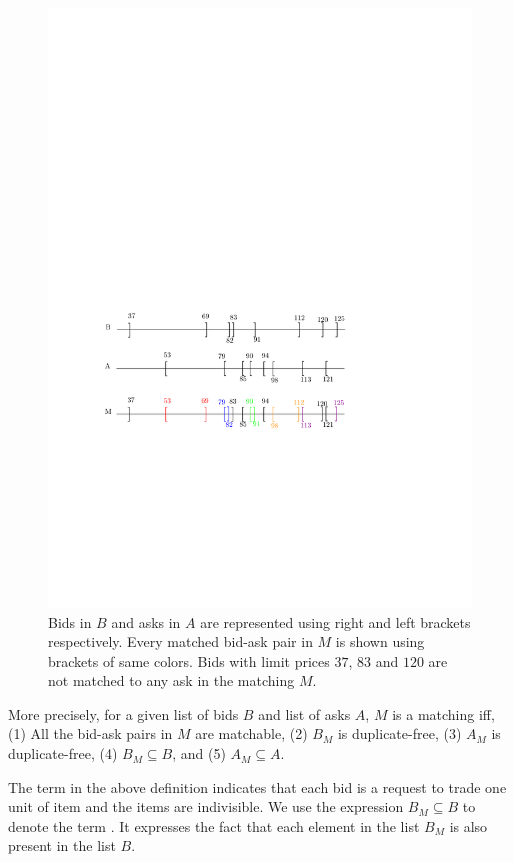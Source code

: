 \documentclass[a4paper,UKenglish,cleveref, autoref]{lipics-v2019}
\begin{document}
\begin{figure}[h!]
\centering
\includegraphics[width=.8\textwidth]{brack_matching.pdf}
\caption{ Bids in $B$ and asks in $A$ are represented using right and left brackets respectively. Every matched bid-ask pair in $M$ is shown using  brackets of same colors. Bids with limit prices $37$, $83$ and $120$ are not matched to any ask in the matching $M$.}
\label{fig:matching}
\end{figure}

More precisely, for a given list of bids $B$ and list of asks $A$, $M$ is a matching iff, (1) All the bid-ask pairs in $M$ are matchable, (2) $B_M$ is duplicate-free, (3) $A_M$ is duplicate-free, (4) $B_M \subseteq B$, and (5) $A_M \subseteq A$.

\begin{definition}
\end{definition}
The term \emph{} in  the above definition indicates that each bid is a request to trade one unit of item and the items are indivisible.  We use the expression $B_M \subseteq B$  to denote the term .  It expresses the fact that each element in the list $B_M$ is also present in the list $B$.
\end{document}
